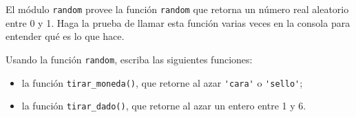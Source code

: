 El módulo \verb!random! provee la función \verb+random+
que retorna un número real aleatorio entre 0 y 1.
Haga la prueba de llamar esta función
varias veces en la consola
para entender qué es lo que hace.

Usando la función \lstinline!random!,
escriba las siguientes funciones:
\begin{itemize}
  \item
    la función \lstinline!tirar_moneda()!,
    que retorne al azar
    \lstinline!'cara'! o \lstinline!'sello'!;
  \item
    la función \lstinline!tirar_dado()!,
    que retorne al azar
    un entero entre 1 y 6.
\end{itemize}
